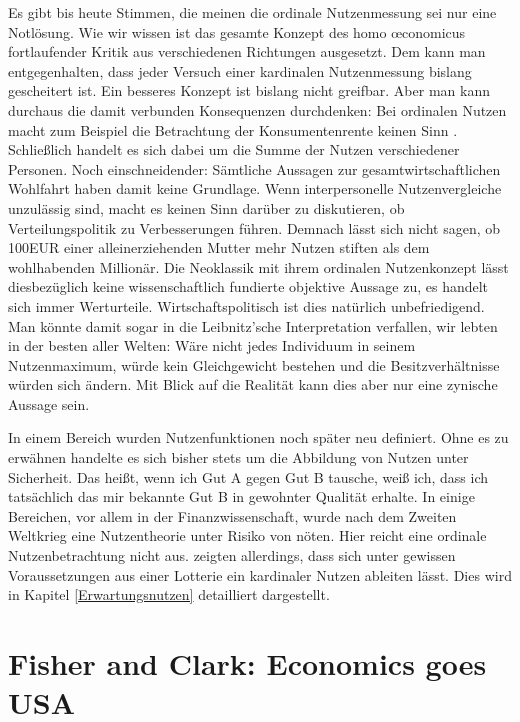 Es gibt bis heute Stimmen, die meinen die ordinale Nutzenmessung sei nur eine Notlösung. Wie wir wissen ist das gesamte Konzept des homo \oe conomicus fortlaufender Kritik aus verschiedenen Richtungen ausgesetzt. Dem kann man entgegenhalten, dass jeder Versuch einer kardinalen Nutzenmessung bislang gescheitert ist. Ein besseres Konzept ist bislang nicht greifbar. Aber man kann durchaus die damit verbunden Konsequenzen durchdenken: Bei ordinalen Nutzen macht zum Beispiel die Betrachtung der Konsumentenrente keinen Sinn \parencite[S: 400]{Rosner2012}. Schließlich handelt es sich dabei um die Summe der Nutzen verschiedener Personen. Noch einschneidender: Sämtliche Aussagen zur gesamtwirtschaftlichen Wohlfahrt haben damit keine Grundlage. Wenn interpersonelle Nutzenvergleiche unzulässig sind, macht es keinen Sinn darüber zu diskutieren, ob Verteilungspolitik zu Verbesserungen führen. Demnach lässt sich nicht sagen, ob 100EUR einer alleinerziehenden Mutter mehr Nutzen stiften als dem wohlhabenden Millionär. Die Neoklassik mit ihrem ordinalen Nutzenkonzept lässt diesbezüglich keine wissenschaftlich fundierte objektive Aussage zu, es handelt sich immer Werturteile. Wirtschaftspolitisch ist dies natürlich unbefriedigend. Man könnte damit sogar in die Leibnitz'sche Interpretation verfallen, wir lebten in der besten aller Welten: Wäre nicht jedes Individuum in seinem Nutzenmaximum, würde kein Gleichgewicht bestehen und die Besitzverhältnisse würden sich ändern. Mit Blick auf die Realität kann dies aber nur eine zynische Aussage sein.

In einem Bereich wurden Nutzenfunktionen noch später neu definiert. Ohne es zu erwähnen handelte es sich bisher stets um die Abbildung von Nutzen unter Sicherheit. Das heißt, wenn ich Gut A gegen Gut B tausche, weiß ich, dass ich tatsächlich das mir bekannte Gut B in gewohnter Qualität erhalte. In einige Bereichen, vor allem in der Finanzwissenschaft, wurde nach dem Zweiten Weltkrieg eine Nutzentheorie unter Risiko von nöten. Hier reicht eine ordinale Nutzenbetrachtung nicht aus. \textcite{VonNeumann1944} zeigten allerdings, dass sich unter gewissen Voraussetzungen aus einer Lotterie ein kardinaler Nutzen ableiten lässt. Dies wird in Kapitel \ref{Erwartungsnutzen} detailliert dargestellt.

\section{Fisher and Clark: Economics goes USA}

